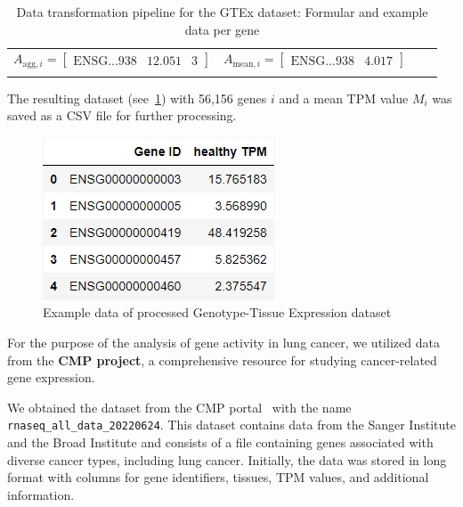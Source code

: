 \begin{table}[h]
{\begin{tabular}{|c|c|c|c|}
        $ A_{\text{agg}, i} = \begin{bmatrix}
            \text{ENSG...938} & 12.051 & 3
        \end{bmatrix}$ &

        $ A_{\text{mean}, i} = \begin{bmatrix}
            \text{ENSG...938} & 4.017
        \end{bmatrix}$ \\

        & & & \\[1mm] %
        \hline
    \end{tabular}
    }
    \caption{Data transformation pipeline for the GTEx dataset: Formular and example data per gene}\label{tab:gtex_table}
\end{table}

The resulting dataset (see~\cref{fig:03_01_df_GTEX_healthy_mean}) with 56,156 genes $i$
and a mean TPM value $M_i$ was saved as a CSV file for further processing.\\

\begin{figure}[h]
    \centering
    \includegraphics[height=\dfheight]{figures/03_01_GTEX_healthy_mean}
    \caption{Example data of processed Genotype-Tissue Expression dataset}
    \label{fig:03_01_df_GTEX_healthy_mean}
\end{figure}



For the purpose of the analysis of gene activity in lung cancer, we utilized data from the \textbf{CMP project},
a comprehensive resource for studying cancer-related gene expression.

We obtained the dataset from the CMP portal~\cite{cmp_download} with the name \texttt{rnaseq\_all\_data\_20220624}.
This dataset contains data from the Sanger Institute and the Broad Institute and
consists of a file containing genes associated with diverse cancer types, including lung cancer.
Initially, the data was stored in long format with columns for gene identifiers, tissues, TPM values,
and additional information.

